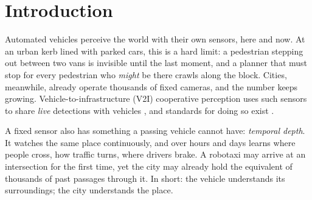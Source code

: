 \documentclass[11pt,a4paper]{article}
\newcommand{\pct}{\,\%}
\begin{document}
\begin{abstract}
(v)~Over four weekday mornings in Athens (pNEUMA, 74{,}405 vehicles), memory built on other mornings is 94--98\pct{} as informative as memory of the same morning at equal volume, and more mornings make it better: location memory transfers across days.
(vi)~A cost-benefit model per block face, with published unit values, shows where this pays: a trusted live camera on a block breaks even at about 3{,}750 robotaxi traversals a day (90\pct{} interval 2{,}340--7{,}450), almost entirely through riders' and vehicles' time rather than avoided crashes, whereas cameras installed for memory alone do not pay where fleets learn their own.
(vii)~At four intersections in Aachen filmed in several sessions on different weekdays (inD), memory of where pedestrians step onto the road built on other days keeps 93\pct{} of the information of same-day memory at equal volume: pedestrian memory, too, transfers across days.
(viii)~On the same data, adding memory features to a gradient-boosting forecast of pedestrians and cyclists that already knows their own motion and their nearest neighbours cuts the 3\,s position error on a day the model has not seen by a further 5\pct{} (0.89 to 0.84\,m), and by 13\pct{} for those who change direction.
\end{abstract}

\section{Introduction}

Automated vehicles perceive the world with their own sensors, here and now.
At an urban kerb lined with parked cars, this is a hard limit: a pedestrian stepping out between two vans is invisible until the last moment, and a planner that must stop for every pedestrian who \emph{might} be there crawls along the block.
Cities, meanwhile, already operate thousands of fixed cameras, and the number keeps growing.
Vehicle-to-infrastructure (V2I) cooperative perception uses such sensors to share \emph{live} detections with vehicles \citep{yu2022dairv2x,yu2023v2xseq,hu2022where2comm,yu2025univ2x}, and standards for doing so exist \citep{etsi2023cpm,etsi2014ldm}.

A fixed sensor also has something a passing vehicle cannot have: \emph{temporal depth}.
It watches the same place continuously, and over hours and days learns where people cross, how traffic turns, where drivers brake.
A robotaxi may arrive at an intersection for the first time, yet the city may already hold the equivalent of thousands of past passages through it.
In short: the vehicle understands its surroundings; the city understands the place.
\end{document}
